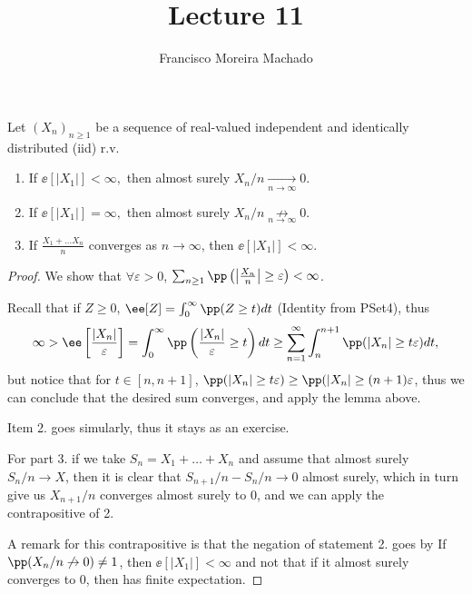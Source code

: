 \documentclass[../main.tex]{subfiles}
\author{Francisco Moreira Machado}
\title{Lecture 11}
\begin{document}
  \begin{corollary}
    Let $(X_n)_{n \geq 1}$ be a sequence of real-valued independent and identically
    distributed (iid) r.v. 
    \begin{enumerate}
      \item If $\ee[|X_1|] < \infty,$ then almost surely $X_n / n \underset{n
        \to \infty}{\to} 0$.
      \item If $\ee[|X_1|] = \infty,$ then almost surely $X_n / n \underset{n
        \to \infty}{\not\to} 0$.
      \item If $\frac{X_1 + \ldots X_n}{n} $ converges as $n \to \infty$, then
        $\ee[|X_1|] < \infty$.
    \end{enumerate}
  \end{corollary}
  \begin{proof}
      We show that $\forall \varepsilon > 0$, $\sum_{n \geq 1} \pp 
      \left( \left| \frac{X_n}{n}  \right| \geq \varepsilon \right) < \infty$.
      
      \vspace{0.5em}

      Recall that if $Z \geq 0$, $\ee[Z] = \int_0^\infty \pp(Z \geq t) dt$
      (Identity from PSet4), thus
      \[
        \infty > \ee \left[ \frac{|X_n|}{\varepsilon}  \right] = \int_{0}^\infty
        \pp \left( \frac{|X_n|}{\varepsilon} \geq t \right)dt \geq \sum_{n =
        1}^\infty \int_{n}^{n+1} \pp(|X_n| \geq t \varepsilon)dt
      ,\] 
      but notice that for $t \in [n, n+1]$, $\pp(|X_n| \geq t \varepsilon) \geq
      \pp(|X_n| \geq (n+1)\varepsilon$, thus we can conclude that the desired
      sum converges, and apply the lemma above.

      \vspace{1em}
      Item 2. goes simularly, thus it stays as an exercise. 

      \vspace{1em}

      For part 3. if we take $S_n = X_1 + \ldots + X_n$ and assume that almost
      surely $S_n / n \to X$, then it is clear that $S_{n+1}/n - S_n/n \to 0$
      almost surely, which in turn give us $X_{n+1}/n$ converges almost surely 
      to $0$, and we can apply the contrapositive of 2.

      \vspace{0.3em}

      A remark for this contrapositive is that the negation of statement 2. goes
      by If $\pp(X_n/n \not\to 0) \neq 1$, then $\ee[|X_1|] < \infty$ and not
      that if it almost surely converges to $0$, then has finite expectation.
  \end{proof}
\end{document}

